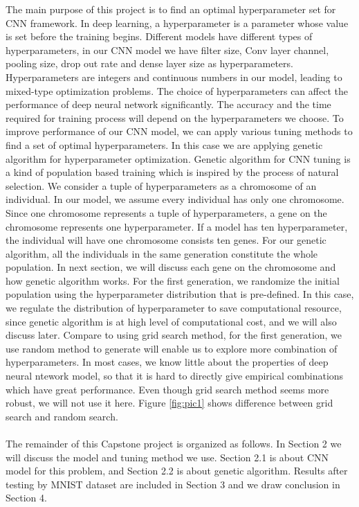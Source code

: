 \documentclass[12pt]{article}
\begin{document}
The main purpose of this project is to find an optimal hyperparameter set for CNN framework. In deep learning, a hyperparameter is a parameter whose value is set before the training begins. Different models have different types of hyperparameters, in our CNN model we have filter size, Conv layer channel, pooling size, drop out rate and dense layer size as hyperparameters. Hyperparameters are integers and continuous numbers in our model, leading to mixed-type optimization problems. The choice of hyperparameters can affect the performance of deep neural network significantly. The accuracy and the time required for training process will depend on the hyperparameters we choose. To improve performance of our CNN model, we can apply various tuning methods to find a set of optimal hyperparameters. In this case we are applying genetic algorithm for hyperparameter optimization. Genetic algorithm for CNN tuning is a kind of population based training which is inspired by the process of natural selection. We consider a tuple of hyperparameters as a chromosome of an individual. In our model, we assume every individual has only one chromosome. Since one chromosome represents a tuple of hyperparameters, a gene on the chromosome represents one hyperparameter. If a model has ten hyperparameter, the individual will have one chromosome consists ten genes. For our genetic algorithm, all the individuals in the same generation constitute the whole population. In next section, we will discuss each gene on the chromosome and how genetic algorithm works. For the first generation, we randomize the initial population using the hyperparameter distribution that is pre-defined. In this case, we regulate the distribution of hyperparameter to save computational resource, since genetic algorithm is at high level of computational cost, and we will also discuss later. Compare to using grid search method, for the first generation, we use random method to generate will enable us to explore more combination of hyperparameters. In most cases, we know little about the properties of deep neural ntework model, so that it is hard to directly give empirical combinations which have great performance. Even though grid search method seems more robust, we will not use it here. Figure \ref{fig:pic1} shows difference between grid search and random search.\\
~\\
The remainder of this Capstone project is organized as follows. In Section 2 we will discuss the model and tuning method we use. Section 2.1 is about CNN model for this problem, and Section 2.2 is about genetic algorithm.  Results after testing by MNIST dataset are included in Section 3 and we draw conclusion in Section 4.  \\
\end{document}
